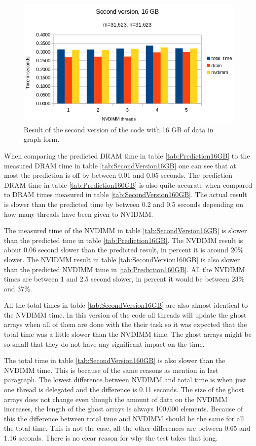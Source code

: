 \documentclass[12pt,a4paper,USenglish]{article}      %
\begin{document}
\begin{figure}[!hbtp]
\includegraphics[scale=0.7]{Large_Array_test/Second_version_16GB.png}
\caption{Result of the second version of the code with 16 GB of data in graph form.}
\label{fig:SecondVersion16GB}
\end{figure}

When comparing the predicted DRAM time in table \ref{tab:Prediction16GB} to the measured DRAM time in table \ref{tab:SecondVersion16GB} one can see that at most the prediction is off by between 0.01 and 0.05 seconds.
The prediction DRAM time in table \ref{tab:Prediction160GB} is also quite accurate when compared to DRAM times measured in table \ref{tab:SecondVersion160GB}. The actual result is slower than the predicted time by between 0.2 and 0.5 seconds depending on how many threads have been given to NVIDMM.

The measured time of the NVDIMM in table \ref{tab:SecondVersion16GB} is slower than the predicted time in table \ref{tab:Prediction16GB}. The NVDIMM result is about 0.06 second slower than the predicted result, in percent it is around 20\% slower. 
The NVIDMM result in table \ref{tab:SecondVersion160GB} is also slower than the predicted NVDIMM time in \ref{tab:Prediction160GB}. All the NVDIMM times are between 1 and 2.5 second slower, in percent it would be between 23\% and 37\%.

All the total times in table \ref{tab:SecondVersion16GB} are also almost identical to the NVDIMM time. In this version of the code all threads will update the ghost arrays when all of them are done with the their task so it was expected that the total time was a little slower than the NVDIMM time. The ghost arrays might be so small that they do not have any significant impact on the time.

The total time in table \ref{tab:SecondVersion160GB} is also slower than the NVDIMM time. This is because of the same reasons as mention in last paragraph. The lowest difference between NVDIMM and total time is when just one thread is delegated and the difference is 0.11 seconds. The size of the ghost arrays does not change even though the amount of data on the NVDIMM increases, the length of the ghost arrays is always 100,000 elements. Because of this the difference between total time and NVDIMM should be the same for all the total time. This is not the case, all the other differences are between 0.65 and 1.16 seconds. There is no clear reason for why the test takes that long.
\end{document}
